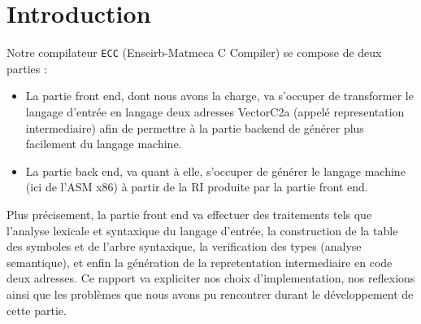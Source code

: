 \newpage
\section*{Introduction}

Notre compilateur \verb?ECC? (Enseirb-Matmeca C Compiler) se compose de deux parties :

\begin{itemize}
\item La partie front end, dont nous avons la charge, va s'occuper de transformer le langage d'entrée en langage deux adresses VectorC2a (appelé representation intermediaire) afin de permettre à la partie backend de générer plus facilement du langage machine.
\item La partie back end, va quant à elle, s'occuper de générer le langage machine (ici de l'ASM x86) à partir de la RI produite par la partie front end.

\end{itemize}


Plus précisement, la partie front end va effectuer des traitements tels que l'analyse lexicale et syntaxique du langage d'entrée, la construction de la table des symboles et de l'arbre syntaxique, la verification des types (analyse semantique), et enfin la génération de la repretentation intermediaire en code deux adresses.
Ce rapport va expliciter nos choix d'implementation, nos reflexions ainsi que les problèmes que nous avons pu rencontrer durant le développement de cette partie.
		
